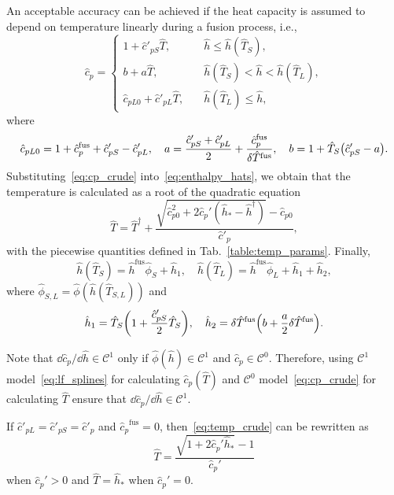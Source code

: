 \documentclass{article}
\newcommand{\fusion}[1]{{#1}^\mathrm{fus}}
\newcommand{\Hh}{\hat{h}}
\newcommand{\HT}{\hat{T}}
\newcommand{\Hc}{\hat{c}}
\newcommand{\Hphi}{\hat{\phi}}
\begin{document}
An acceptable accuracy can be achieved if the heat capacity is assumed
to depend on temperature linearly during a fusion process, i.e.,
\begin{equation}\label{eq:cp_crude}
	\Hc_p = \begin{cases}
        1 + \Hc'_{pS}\HT,         & \quad \Hh \leq \Hh(\HT_S), \\
        b + a\HT,                 & \quad \Hh(\HT_S) < \Hh < \Hh(\HT_L), \\
        \Hc_{pL0} + \Hc'_{pL}\HT, & \quad \Hh(\HT_L) \leq \Hh,
    \end{cases}
\end{equation}
where
\begin{equation*}
	\Hc_{pL0} = 1 + \fusion{\Hc_p} + \Hc'_{pS} - \Hc'_{pL}, \quad
	a = \frac{\Hc'_{pS} + \Hc'_{pL}}2 + \frac{\fusion{\Hc_p}}{\delta\fusion{\HT}}, \quad
	b = 1 + \HT_S\qty(\Hc'_{pS} - a).
\end{equation*}
Substituting~\eqref{eq:cp_crude} into~\eqref{eq:enthalpy_hats},
we obtain that the temperature is calculated as a root of the quadratic equation
\begin{equation}\label{eq:temp_crude}
	\HT = \HT^\dag + \frac{\sqrt{\Hc_{p0}^2 + 2\Hc_p'(\Hh_* - \Hh^\dag) } - \Hc_{p0}}{\Hc'_p},
\end{equation}
with the piecewise quantities defined in Tab.~\ref{table:temp_params}. Finally,
\begin{equation}\label{eq:enthalpySL_crude}
	\Hh(\HT_S) = \fusion{\Hh}\Hphi_S + \Hh_1, \quad \Hh(\HT_L) = \fusion{\Hh}\Hphi_L + \Hh_1 + \Hh_2,
\end{equation}
where \(\Hphi_{S,L} = \Hphi(\Hh(\HT_{S,L}))\) and
\begin{equation*}
	\Hh_1 = \HT_S\qty(1 + \frac{\Hc'_{pS}}2\HT_S), \quad
	\Hh_2 = \delta\fusion{\HT}\qty(b + \frac{a}2\delta\fusion{\HT}).
\end{equation*}

Note that \(\dd\Hc_p/\dd\Hh\in\mathcal{C}^1\)
only if \(\Hphi(\Hh)\in\mathcal{C}^1\) and \(\Hc_p\in\mathcal{C}^0\).
Therefore, using \(\mathcal{C}^1\) model~\eqref{eq:lf_splines} for calculating \(\Hc_p(\HT)\)
and \(\mathcal{C}^0\) model~\eqref{eq:cp_crude} for calculating \(\HT\)
ensure that \(\dd\Hc_p/\dd\Hh\in\mathcal{C}^1\).

If \(\Hc'_{pL} = \Hc'_{pS} = \Hc'_p\) and \(\fusion{\Hc_{p}} = 0\),
then~\eqref{eq:temp_crude} can be rewritten as
\begin{equation}\label{eq:temp_crude2}
	\HT = \frac{\sqrt{1+2\Hc_p'\Hh_*}-1}{\Hc_p'}
\end{equation}
when \(\Hc_p'>0\) and \(\HT = \Hh_*\) when \(\Hc_p'=0\).
\end{document}
